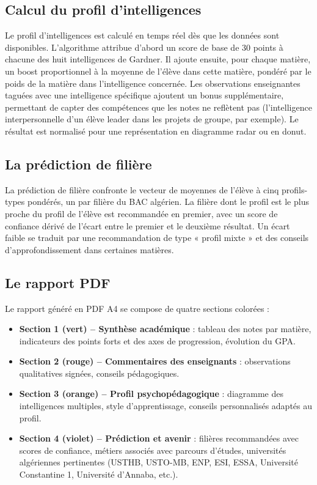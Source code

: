 \documentclass[12pt,a4paper,oneside]{report}
\begin{document}
\subsection{Calcul du profil d'intelligences}

Le profil d'intelligences est calculé en temps réel dès que les données sont disponibles. L'algorithme attribue d'abord un score de base de 30 points à chacune des huit intelligences de Gardner. Il ajoute ensuite, pour chaque matière, un boost proportionnel à la moyenne de l'élève dans cette matière, pondéré par le poids de la matière dans l'intelligence concernée. Les observations enseignantes taguées avec une intelligence spécifique ajoutent un bonus supplémentaire, permettant de capter des compétences que les notes ne reflètent pas (l'intelligence interpersonnelle d'un élève leader dans les projets de groupe, par exemple). Le résultat est normalisé pour une représentation en diagramme radar ou en donut.

\subsection{La prédiction de filière}

La prédiction de filière confronte le vecteur de moyennes de l'élève à cinq profils-types pondérés, un par filière du \ac{BAC} algérien. La filière dont le profil est le plus proche du profil de l'élève est recommandée en premier, avec un score de confiance dérivé de l'écart entre le premier et le deuxième résultat. Un écart faible se traduit par une recommandation de type « profil mixte » et des conseils d'approfondissement dans certaines matières.

\subsection{Le rapport PDF}

Le rapport généré en PDF A4 se compose de quatre sections colorées :

\begin{itemize}
  \item \textbf{Section 1 (vert) -- Synthèse académique} : tableau des notes par matière, indicateurs des points forts et des axes de progression, évolution du GPA.
  \item \textbf{Section 2 (rouge) -- Commentaires des enseignants} : observations qualitatives signées, conseils pédagogiques.
  \item \textbf{Section 3 (orange) -- Profil psychopédagogique} : diagramme des intelligences multiples, style d'apprentissage, conseils personnalisés adaptés au profil.
  \item \textbf{Section 4 (violet) -- Prédiction et avenir} : filières recommandées avec scores de confiance, métiers associés avec parcours d'études, universités algériennes pertinentes (USTHB, USTO-MB, ENP, ESI, ESSA, Université Constantine 1, Université d'Annaba, etc.).
\end{itemize}
\end{document}
